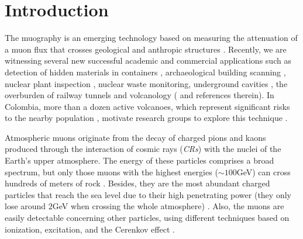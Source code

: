 \documentclass[submitting]{nst}
\begin{document}
\maketitle
\section{Introduction}\label{sec:introduction}
The muography is an emerging technology based on measuring the attenuation of a muon flux that crosses geological and anthropic structures \cite{Kaiser2019}. Recently, we are witnessing several new successful academic and commercial applications such as detection of hidden materials in containers \cite{BlanpiedEtal2015}, archaeological building scanning \cite{MorishimaEtal2017, GomezEtal2016}, nuclear plant inspection \cite{FujiiEtal2013}, nuclear waste monitoring, underground cavities \cite{SaracinoEtal2017}, the overburden of railway tunnels \cite{ThompsonEtal2019} and volcanology (\cite{TanakaOlah2019} and references therein). In Colombia, more than a dozen active volcanoes, which represent significant risks to the nearby population \cite{Cortes2016, Agudelo2016, Munoz2017}, motivate research groups to explore this technique \cite{AsoreyEtal2017B, SierraPortaEtal2018, PenaRodriguezEtal2018, GuerreroEtal2019, ParraAvila2019}.  

Atmospheric muons originate from the decay of charged pions and kaons produced through the interaction of cosmic rays (\textsl{CRs}) with the nuclei of the Earth's upper atmosphere. The energy of these particles comprises a broad spectrum, but only those muons with the highest energies ($\sim 100$GeV) can cross hundreds of meters of rock \cite{MarteauEtal2012}. Besides, they are the most abundant charged particles that reach the sea level due to their high penetrating power (they only lose around $2$GeV when crossing the whole atmosphere) \cite{MarteauEtal2012}. Also, the muons are easily detectable concerning other particles, using different techniques based on ionization, excitation, and the Cerenkov effect \cite{MarteauEtal2012}. 
\end{document}
